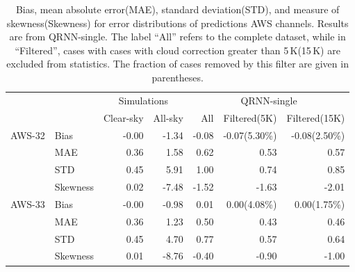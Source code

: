 \documentclass[amt, manuscript]{copernicus}
\begin{document}
\begin{table}[t]
	\caption{Bias, mean absolute error(MAE), standard deviation(STD), and measure of skewness(Skewness) for error distributions of predictions AWS channels. Results are from QRNN-single. The label ``All'' refers to the complete dataset, while in ``Filtered'', cases with cases with cloud correction greater than 5\,K(15\,K) are excluded from statistics. The fraction of cases removed by this filter are given in parentheses.}
	\label{tab:statistics_qrnn_aws}
	\begin{tabular}{llrr|rrr}
		\tophline
		&&\multicolumn{2}{c|}{Simulations}& \multicolumn{3}{c}{QRNN-single} \\
		\cline{3-7}
		&&   Clear-sky &   All-sky &   		 All &   Filtered(5K)& Filtered(15K) \\
		\middlehline
AWS-32    &Bias     &   -0.00 &         -1.34 &           -0.08 &       		-0.07(5.30\%) & -0.08(2.50\%) \\
          &MAE      &    0.36 &          1.58 &            0.62 &        		 0.53 		  &	0.57	\\
          &STD      &    0.45 &          5.91 &            1.00 &        		 0.74 		  & 0.85\\
          &Skewness &    0.02 &         -7.48 &           -1.52 &       		-1.63 		  & -2.01\\
		\middlehline
AWS-33	  &Bias     &   -0.00 &         -0.98 &            0.01 &                 0.00(4.08\%)& 0.00(1.75\%)\\
		  &MAE      &    0.36 &          1.23 &            0.50 &                 0.43 	      & 0.46\\
		  &STD      &    0.45 &          4.70 &            0.77 &                 0.57 	      & 0.64\\
		  &Skewness &    0.01 &         -8.76 &           -0.40 &                -0.90  	  & -1.00\\


\end{tabular}
\end{table}
\end{document}
